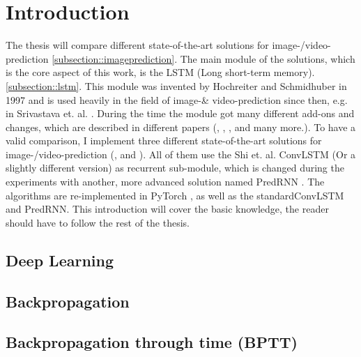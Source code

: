 \section{Introduction} \label{section::introduction}
 The thesis will compare different state-of-the-art solutions for image-/video-prediction \ref{subsection::imageprediction}.
 The main module of the solutions, which is the core aspect of this work, is the LSTM (Long short-term memory). \ref{subsection::lstm}.
 This module was invented by Hochreiter and Schmidhuber  \cite{Hochreiter1997} in 1997 and is used heavily in the field of image-\& video-prediction since then, e.g. in Srivastava et. al. 
 \cite{Srivastava2015}.
 During the time the module got many different add-ons and changes, which are described in different papers (\cite{Patraucean2015}, \cite{Lotter2016}, \cite{Wang2017}, \cite{Wang2018} and many 
 more.). To have a valid comparison, I implement three different state-of-the-art solutions for image-/video-prediction (\cite{Shi2015}, \cite{Patraucean2015} and \cite{Lotter2016}).
 All of them use the Shi et. al. ConvLSTM \cite{Shi2015} (Or a slightly different version) as recurrent sub-module, which is changed during the experiments
 with another, more advanced solution named PredRNN \cite{Wang2017}. The algorithms are re-implemented in PyTorch \cite{Paszke2019}, as well as the \glqq standard\grqq ConvLSTM and PredRNN.
 This introduction will cover the basic knowledge, the reader should have to follow the rest of the thesis.
 
 \subsection{Deep Learning} \label{subsection::deeplearning}
 
 \subsection{Backpropagation} \label{subsection::backpropagation}
 
 \subsection{Backpropagation through time (BPTT)} \label{subsection::bptt}
 
